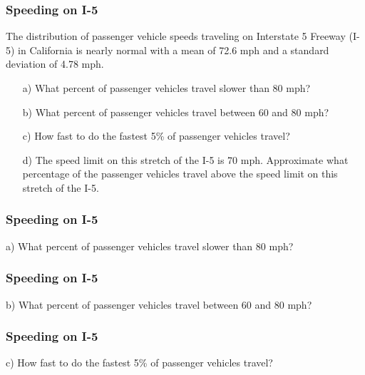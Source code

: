 \documentclass[slides]{beamer}
\begin{document}
\begin{frame}
\frametitle{Speeding on I-5}
The distribution of passenger vehicle speeds traveling on Interstate 5 Freeway (I-5) in California is nearly normal with a mean of 72.6 mph and a standard deviation of 4.78 mph.

\vspace{0.25cm}

\begin{enumerate}
\item[a)] What percent of passenger vehicles travel slower than 80 mph?
\item[b)] What percent of passenger vehicles travel between 60 and 80 mph?
\item[c)] How fast to do the fastest 5\% of passenger vehicles travel?
\item[d)] The speed limit on this stretch of the I-5 is 70 mph. Approximate what percentage of
the passenger vehicles travel above the speed limit on this stretch of the I-5.
\end{enumerate}

\end{frame}


\begin{frame}
\frametitle{Speeding on I-5}
a) What percent of passenger vehicles travel slower than 80 mph?

\vspace{7cm}

\end{frame}


\begin{frame}
\frametitle{Speeding on I-5}
b) What percent of passenger vehicles travel between 60 and 80 mph?

\vspace{7cm}

\end{frame}


\begin{frame}
\frametitle{Speeding on I-5}
c) How fast to do the fastest 5\% of passenger vehicles travel?

\vspace{7cm}

\end{frame}
\end{document}
